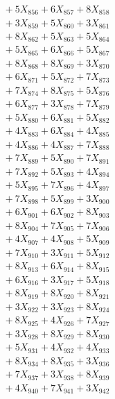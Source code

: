 \documentclass[a4paper,10pt]{article}
\begin{document}
{\begin{align}
&\;  + 5 X_{856} + 6 X_{857} + 8 X_{858} \\[0.3ex]
&\;  + 3 X_{859} + 5 X_{860} + 3 X_{861} \\[0.3ex]
&\;  + 8 X_{862} + 5 X_{863} + 5 X_{864} \\[0.3ex]
&\;  + 5 X_{865} + 6 X_{866} + 5 X_{867} \\[0.3ex]
&\;  + 8 X_{868} + 8 X_{869} + 3 X_{870} \\[0.3ex]
&\;  + 6 X_{871} + 5 X_{872} + 7 X_{873} \\[0.3ex]
&\;  + 7 X_{874} + 8 X_{875} + 5 X_{876} \\[0.3ex]
&\;  + 6 X_{877} + 3 X_{878} + 7 X_{879} \\[0.5ex]\allowbreak
&\;  + 5 X_{880} + 6 X_{881} + 5 X_{882} \\[0.3ex]
&\;  + 4 X_{883} + 6 X_{884} + 4 X_{885} \\[0.3ex]
&\;  + 4 X_{886} + 4 X_{887} + 7 X_{888} \\[0.3ex]
&\;  + 7 X_{889} + 5 X_{890} + 7 X_{891} \\[0.3ex]
&\;  + 7 X_{892} + 5 X_{893} + 4 X_{894} \\[0.3ex]
&\;  + 5 X_{895} + 7 X_{896} + 4 X_{897} \\[0.3ex]
&\;  + 7 X_{898} + 5 X_{899} + 3 X_{900} \\[0.3ex]
&\;  + 6 X_{901} + 6 X_{902} + 8 X_{903} \\[0.3ex]
&\;  + 8 X_{904} + 7 X_{905} + 7 X_{906} \\[0.3ex]
&\;  + 4 X_{907} + 4 X_{908} + 5 X_{909} \\[0.5ex]\allowbreak
&\;  + 7 X_{910} + 3 X_{911} + 5 X_{912} \\[0.3ex]
&\;  + 8 X_{913} + 6 X_{914} + 8 X_{915} \\[0.3ex]
&\;  + 6 X_{916} + 3 X_{917} + 5 X_{918} \\[0.3ex]
&\;  + 8 X_{919} + 8 X_{920} + 8 X_{921} \\[0.3ex]
&\;  + 3 X_{922} + 3 X_{923} + 8 X_{924} \\[0.3ex]
&\;  + 8 X_{925} + 4 X_{926} + 7 X_{927} \\[0.3ex]
&\;  + 3 X_{928} + 8 X_{929} + 8 X_{930} \\[0.3ex]
&\;  + 5 X_{931} + 4 X_{932} + 4 X_{933} \\[0.3ex]
&\;  + 8 X_{934} + 8 X_{935} + 3 X_{936} \\[0.3ex]
&\;  + 7 X_{937} + 3 X_{938} + 8 X_{939} \\[0.5ex]\allowbreak
&\;  + 4 X_{940} + 7 X_{941} + 3 X_{942} \\[0.3ex]

\end{align}}
\end{document}
